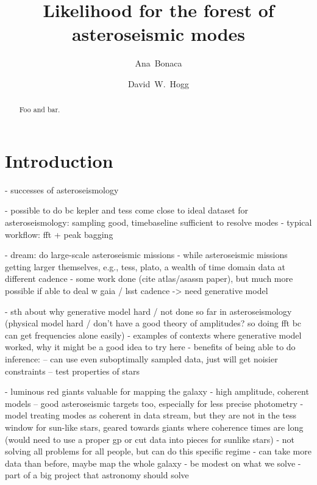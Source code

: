 \documentclass[modern]{aastex63}
\begin{document}
\sloppy\sloppypar\raggedbottom\frenchspacing %

\title{Likelihood for the forest of asteroseismic modes}


\author[0000-0002-7846-9787]{Ana~Bonaca}

\author[0000-0003-2866-9403]{David~W.~Hogg}

\begin{abstract}\noindent %
Foo and bar.
\end{abstract}

\section{Introduction}
\label{sec:intro}

- successes of asteroseismology

- possible to do bc kepler and tess come close to ideal dataset for asteroseismology: sampling good, timebaseline sufficient to resolve modes
- typical workflow: fft + peak bagging

- dream: do large-scale asteroseismic missions
- while asteroseismic missions getting larger themselves, e.g., tess, plato, a wealth of time domain data at different cadence
- some work done (cite atlas/asassn paper), but much more possible if able to deal w gaia / lsst cadence
-> need generative model

- sth about why generative model hard / not done so far in asteroseismology (physical model hard / don't have a good theory of amplitudes? so doing fft bc can get frequencies alone easily)
- examples of contexts where generative model worked, why it might be a good idea to try here
- benefits of being able to do inference:
-- can use even suboptimally sampled data, just will get noisier constraints
-- test properties of stars

- luminous red giants valuable for mapping the galaxy
- high amplitude, coherent models -- good asteroseismic targets too, especially for less precise photometry
- model treating modes as coherent in data stream, but they are not in the tess window for sun-like stars, geared towards giants where coherence times are long (would need to use a proper gp or cut data into pieces for sunlike stars)
- not solving all problems for all people, but can do this specific regime
- can take more data than before, maybe map the whole galaxy
- be modest on what we solve
- part of a big project that astronomy should solve
\end{document}
